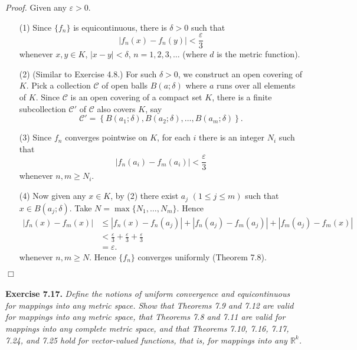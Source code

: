 \documentclass{article}
\begin{document}
\emph{Proof.}
Given any $\varepsilon > 0$.
\begin{enumerate}
  \item[(1)]
  Since $\{f_n\}$ is equicontinuous, there is $\delta > 0$ such that
  \[
    |f_n(x) - f_n(y)| < \frac{\varepsilon}{3}
  \]
  whenever $x,y \in K$, $|x-y| < \delta$, $n = 1,2,3,\ldots$
  (where $d$ is the metric function).

  \item[(2)]
  (Similar to Exercise 4.8.)
  For such $\delta > 0$, we construct an open covering of $K$.
  Pick a collection $\mathscr{C}$ of open balls
  $B(a;\delta)$
  where $a$ runs over all elements of $K$.
  Since $\mathscr{C}$ is an open covering of a compact set $K$,
  there is a finite subcollection $\mathscr{C}'$ of $\mathscr{C}$
  also covers $K$, say
  \[
    \mathscr{C}'
    = \left\{B(a_1;\delta), B(a_2;\delta), \ldots, B(a_m;\delta) \right\}.
  \]

  \item[(3)]
  Since $f_n$ converges pointwise on $K$,
  for each $i$ there is an integer $N_i$ such that
  \[
    |f_n(a_i)-f_m(a_i)| < \frac{\varepsilon}{3}
  \]
  whenever $n,m \geq N_i$.

  \item[(4)]
  Now given any $x \in K$, by (2) there exist $a_j$ $(1 \leq j \leq m)$
  such that $x \in B(a_j;\delta)$.
  Take $N = \max\{N_1,\ldots,N_m\}$.
  Hence
  \begin{align*}
    |f_n(x)-f_m(x)|
    &\leq
    |f_n(x)-f_n(a_j)| + |f_n(a_j)-f_m(a_j)| + |f_m(a_j)-f_m(x)| \\
    &<
    \frac{\varepsilon}{3} + \frac{\varepsilon}{3} + \frac{\varepsilon}{3} \\
    &=
    \varepsilon.
  \end{align*}
  whenever $n,m \geq N$.
  Hence $\{f_n\}$ converges uniformly (Theorem 7.8).
\end{enumerate}
$\Box$ \\\\






\textbf{Exercise 7.17.}
\emph{Define the notions of uniform convergence and equicontinuous
for mappings into any metric space.
Show that Theorems 7.9 and 7.12 are valid for mappings into any metric space,
that Theorems 7.8 and 7.11 are valid for mappings into any complete metric space,
and that Theorems 7.10, 7.16, 7.17, 7.24, and 7.25 hold for
vector-valued functions, that is, for mappings into any $\mathbb{R}^k$.} \\
\end{document}

